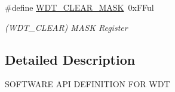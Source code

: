 \begin{DoxyCompactItemize}
\item 
\hypertarget{group___s_a_m_l21___w_d_t_gac1d3629de6e3c37cd93d94aad9cec4e6}{}\#define \hyperlink{group___s_a_m_l21___w_d_t_gac1d3629de6e3c37cd93d94aad9cec4e6}{W\+D\+T\+\_\+\+C\+L\+E\+A\+R\+\_\+\+M\+A\+S\+K}~0x\+F\+Ful\label{group___s_a_m_l21___w_d_t_gac1d3629de6e3c37cd93d94aad9cec4e6}

\begin{DoxyCompactList}\small\item\em (W\+D\+T\+\_\+\+C\+L\+E\+A\+R) M\+A\+S\+K Register \end{DoxyCompactList}\end{DoxyCompactItemize}


\subsection{Detailed Description}
S\+O\+F\+T\+W\+A\+R\+E A\+P\+I D\+E\+F\+I\+N\+I\+T\+I\+O\+N F\+O\+R W\+D\+T 